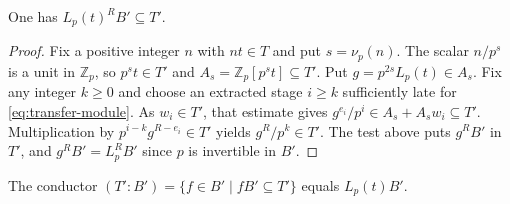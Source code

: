 \begin{lemma}
    \label{lem:exact-transfer}
    One has $L_p(t)^R B' \subseteq T'$.
\end{lemma}

\begin{proof}
    Fix a positive integer $n$ with $nt \in T$ and put $s = \nu_p(n)$.
    The scalar $n/p^s$ is a unit in $\mathbb{Z}_p$, so $p^s t \in T'$ and $A_s = \mathbb{Z}_p[p^s t] \subseteq T'$.
    Put $g = p^{2s}L_p(t) \in A_s$.
    Fix any integer $k \ge 0$ and choose an extracted stage $i \ge k$ sufficiently late for \eqref{eq:transfer-module}.
    As $w_i \in T'$, that estimate gives $g^{e_i}/p^i \in A_s + A_s w_i \subseteq T'$.
    Multiplication by $p^{i - k}g^{R - e_i} \in T'$ yields $g^R/p^k \in T'$.
    The test above puts $g^R B'$ in $T'$, and $g^R B' = L_p^R B'$ since $p$ is invertible in $B'$.
\end{proof}

\begin{lemma}
    \label{lem:local-conductor}
    The conductor $(T' : B') = \{f \in B' \mid fB' \subseteq T'\}$ equals $L_p(t)B'$.
\end{lemma}

